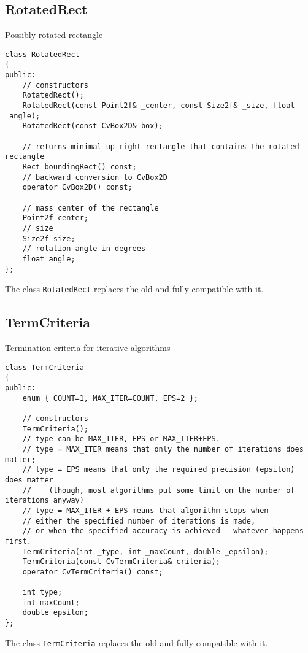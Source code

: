 \subsection{RotatedRect}\label{RotatedRect}
Possibly rotated rectangle

\begin{lstlisting}
class RotatedRect
{
public:
    // constructors
    RotatedRect();
    RotatedRect(const Point2f& _center, const Size2f& _size, float _angle);
    RotatedRect(const CvBox2D& box);
    
    // returns minimal up-right rectangle that contains the rotated rectangle
    Rect boundingRect() const;
    // backward conversion to CvBox2D
    operator CvBox2D() const;
    
    // mass center of the rectangle
    Point2f center;
    // size
    Size2f size;
    // rotation angle in degrees
    float angle;
};
\end{lstlisting}

The class \texttt{RotatedRect} replaces the old  and fully compatible with it.

\subsection{TermCriteria}\label{TermCriteria}

Termination criteria for iterative algorithms

\begin{lstlisting}
class TermCriteria
{
public:
    enum { COUNT=1, MAX_ITER=COUNT, EPS=2 };

    // constructors
    TermCriteria();
    // type can be MAX_ITER, EPS or MAX_ITER+EPS.
    // type = MAX_ITER means that only the number of iterations does matter;
    // type = EPS means that only the required precision (epsilon) does matter
    //    (though, most algorithms put some limit on the number of iterations anyway)
    // type = MAX_ITER + EPS means that algorithm stops when
    // either the specified number of iterations is made,
    // or when the specified accuracy is achieved - whatever happens first.
    TermCriteria(int _type, int _maxCount, double _epsilon);
    TermCriteria(const CvTermCriteria& criteria);
    operator CvTermCriteria() const;

    int type;
    int maxCount;
    double epsilon;
};
\end{lstlisting}

The class \texttt{TermCriteria} replaces the old  and fully compatible with it.


